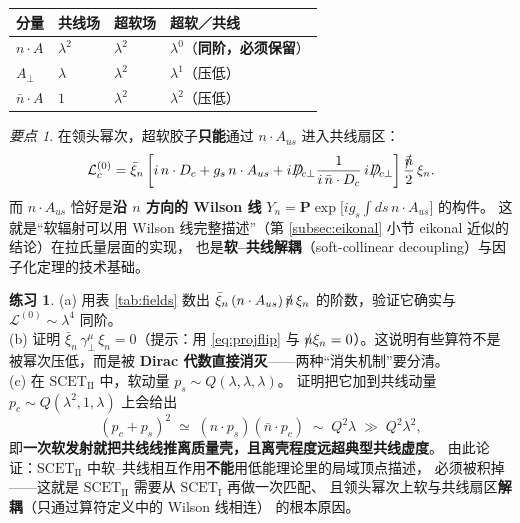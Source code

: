 \documentclass[UTF8,a4paper,11pt]{ctexart}
\theoremstyle{definition}
\newtheorem{exercise}{练习}[section]
\theoremstyle{remark}
\newtheorem{keypoint}{要点}[section]
\theoremstyle{plain}
\newcommand{\nsl}{n\mkern-10.5mu/\mkern1.5mu}
\newcommand{\nbsl}{\bar{n}\mkern-10.5mu/\mkern1.5mu}
\newcommand{\Dsl}{D\mkern-11.5mu/}
\newcommand{\SCETI}{\text{SCET}_{\mathrm{I}}}
\newcommand{\SCETII}{\text{SCET}_{\mathrm{II}}}
\newcommand{\en}[1]{\textsf{#1}}   %
\newcommand{\Pexp}{\mathbf{P}\exp}
\begin{document}
\begin{center}
\begin{tabular}{@{}llll@{}}
\toprule
分量 & 共线场 & 超软场 & 超软／共线 \\
\midrule
$n\cdot A$        & $\lambda^2$ & $\lambda^2$ & $\lambda^0$（\textbf{同阶，必须保留}）\\
$A_\perp$         & $\lambda$   & $\lambda^2$ & $\lambda^1$（压低）\\
$\bar n\cdot A$   & $1$         & $\lambda^2$ & $\lambda^2$（压低）\\
\bottomrule
\end{tabular}
\end{center}

\begin{keypoint}
\label{kp:usoft}
在领头幂次，超软胶子\textbf{只能}通过 $n\cdot A_{us}$ 进入共线扇区：
\begin{equation}
  \mathcal L_c^{(0)}
  =\bar\xi_n\left[i\,n\cdot D_c+g_s\,n\cdot A_{us}
   +i\Dsl_{c\perp}\frac{1}{i\,\bar n\cdot D_c}\,i\Dsl_{c\perp}\right]
   \frac{\nbsl}{2}\,\xi_n .
  \label{eq:Lcusoft}
\end{equation}
而 $n\cdot A_{us}$ 恰好是\textbf{沿 $n$ 方向的 Wilson 线}
$Y_n=\Pexp\big[ig_s\!\int ds\,n\cdot A_{us}\big]$ 的构件。
这就是“软辐射可以用 Wilson 线完整描述”（第 \ref{subsec:eikonal}
小节 eikonal 近似的结论）在拉氏量层面的实现，
也是\textbf{软--共线解耦}（\en{soft-collinear decoupling}）与因子化定理的技术基础。
\end{keypoint}

\begin{exercise}
(a) 用表 \ref{tab:fields} 数出 $\bar\xi_n\,(n\cdot A_{us})\,\nbsl\,\xi_n$
的阶数，验证它确实与 $\mathcal L^{(0)}\sim\lambda^4$ 同阶。\\
(b) 证明 $\bar\xi_n\,\gamma_\perp^\mu\,\xi_n=0$（提示：用 \eqref{eq:projflip}
与 $\nsl\xi_n=0$）。这说明有些算符不是被幂次压低，而是被
\textbf{Dirac 代数直接消灭}——两种“消失机制”要分清。\\
(c) 在 $\SCETII$ 中，软动量 $p_s\sim Q(\lambda,\lambda,\lambda)$。
证明把它加到共线动量 $p_c\sim Q(\lambda^2,1,\lambda)$ 上会给出
\begin{equation}
  (p_c+p_s)^2\;\simeq\;(n\cdot p_s)(\bar n\cdot p_c)\;\sim\;Q^2\lambda
  \;\gg\; Q^2\lambda^2 ,
  \label{eq:scet2offshell}
\end{equation}
即\textbf{一次软发射就把共线线推离质量壳，且离壳程度远超典型共线虚度}。
由此论证：$\SCETII$ 中软--共线相互作用\textbf{不能}用低能理论里的局域顶点描述，
必须被积掉——这就是 $\SCETII$ 需要从 $\SCETI$ 再做一次匹配、
且领头幂次上软与共线扇区\textbf{解耦}（只通过算符定义中的 Wilson 线相连）
的根本原因。
\end{exercise}
\end{document}
